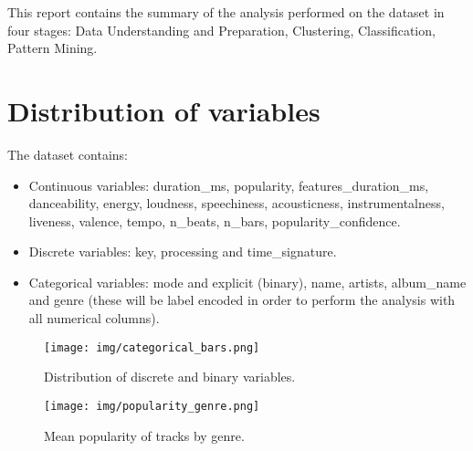 This report contains the summary of the analysis performed on the dataset in four stages: Data Understanding and Preparation, Clustering, Classification, Pattern Mining.

\section{Distribution of variables}
The dataset contains:
\begin{itemize}
    \item Continuous variables: duration\_ms, popularity, features\_duration\_ms, danceability, energy, loudness, speechiness, acousticness, instrumentalness, liveness, valence, tempo, n\_beats, n\_bars, popularity\_confidence.
    \item Discrete variables: key, processing and time\_signature.
    \item Categorical variables: mode and explicit (binary), name, artists, album\_name and genre (these will be label encoded in order to perform the analysis with all numerical columns).
\end{itemize}
\begin{figure}[H]
    \begin{minipage}{0.45\textwidth}
        \centering
        \texttt{[image: img/categorical\_bars.png]}
        \caption{Distribution of discrete and binary variables.}
        \label{fig:enter-label}
    \end{minipage}
    \hfill
    \begin{minipage}{0.45\textwidth}
        \centering
        \texttt{[image: img/popularity\_genre.png]}
        \caption{Mean popularity of tracks by genre.} 
        \label{fig:enter-label2}
    \end{minipage}
\end{figure}


